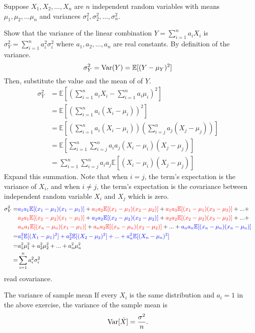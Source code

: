 \begin{exec}
  Suppose $X_1,X_2,...,X_n$ are $n$ independent random variables with means $\mu_1,\mu_2,...\mu_n$ and variances $\sigma_1^2,\sigma_2^2,...,\sigma_n^2$.

  Show that the variance of the linear combination $Y=\sum_{i=1}^{n}a_iX_i$ is $\sigma_Y^2=\sum_{i=1}^{n}a_i^2\sigma_i^2$ where $a_1,a_2,...,a_n$ are real constants.
  \tcblower
  By definition of the variance.
  \begin{equation*}
    \sigma_Y^2=\operatorname{\mathrm{Var}}(Y)=\mathbb{E}[(Y-\mu_Y)^2]
  \end{equation*}
  Then, substitute the value and the mean of of $Y$.
  \begin{align*}
    \sigma_Y^2
    &=\mathbb{E}\left[\left(\sum_{i=1}^{n}a_iX_i-\sum_{i=1}^{n}a_i\mu_i\right)^2\right]\\
    &=\mathbb{E}\left[\left(\sum_{i=1}^{n}a_i(X_i-\mu_i)\right)^2\right]\\
    &=\mathbb{E}\left[\left(\sum_{i=1}^{n}a_i(X_i-\mu_i)\right) \left(\sum_{i=j}^{n}a_j(X_j-\mu_j)\right)\right]\\
    &=\mathbb{E}\left[\sum_{i=1}^{n}\sum_{i=j}^{n}a_ia_j(X_i-\mu_i)(X_j-\mu_j) \right]\\
    &=\sum_{i=1}^{n}\sum_{i=j}^{n}a_ia_j\mathbb{E}\left[(X_i-\mu_i)(X_j-\mu_j) \right]
  \end{align*}
  Expand this summation. Note that when $i=j$, the term's expectation is the variance of $X_i$, and when $i\neq j$, the term's expectation is the covariance between independent random variable $X_i$ and $X_j$ which is zero.
  \begin{align*}
    \sigma_Y^2
    =&\mathcolor{blue}{a_1a_1\mathbb{E}[(x_1-\mu_1)(x_1-\mu_1)]}+
      \mathcolor{red}{a_1a_2\mathbb{E}[(x_1-\mu_1)(x_2-\mu_2)]}+
      \mathcolor{red}{a_1a_3\mathbb{E}[(x_1-\mu_1)(x_3-\mu_3)]}+ ... +\\
     &\mathcolor{red}{a_2a_1\mathbb{E}[(x_2-\mu_2)(x_1-\mu_1)]}+
      \mathcolor{blue}{a_2a_2\mathbb{E}[(x_2-\mu_2)(x_2-\mu_2)]}+
      \mathcolor{red}{a_2a_2\mathbb{E}[(x_2-\mu_2)(x_3-\mu_3)]}+ ... +\\
     &\mathcolor{red}{a_na_1\mathbb{E}[(x_n-\mu_n)(x_1-\mu_1)]}+
      \mathcolor{red}{a_na_2\mathbb{E}[(x_n-\mu_n)(x_2-\mu_2)]}+...+
      \mathcolor{blue}{a_na_n\mathbb{E}[(x_n-\mu_n)(x_n-\mu_n)]}\\
    =&\mathcolor{blue}{a_1^2\mathbb{E}[(X_1-\mu_1)^2]+a_2^2\mathbb{E}[(X_2-\mu_2)^2]+...+a_n^2\mathbb{E}[(X_n-\mu_n)^2]}\\
    =&a_1^2\mu_1^2+a_2^2\mu_2^2+...+a_n^2\mu_n^2\\
    =&\sum_{i=1}^{n}a_i^2\sigma_i^2
  \end{align*}
  \TODO read covariance.
\end{exec}

\begin{fact}{The variance of sample mean}{}
  If every $X_i$ is the same distribution and $a_i=1$ in the above exercise, the variance of the sample mean is
  \begin{equation*}
    \operatorname{\mathrm{Var}}[\bar{X}]=\frac{\sigma^2}{n}.
  \end{equation*}
\end{fact}

